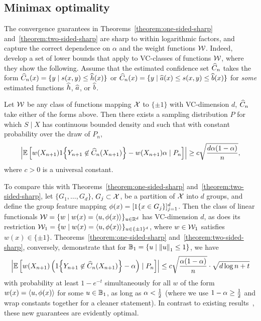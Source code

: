 \documentclass{article}
\newcommand{\scorefunc}{s}
\newcommand{\scoreval}{\scorefunc}
\newcommand{\scorerv}{S}
\begin{document}
\subsection{Minimax optimality}

The convergence guarantees in Theorems~\ref{theorem:one-sided-sharp}
and~\ref{theorem:two-sided-sharp} are sharp to within logarithmic factors,
and capture the correct dependence on $\alpha$ and the weight functions
$\mathcal{W}$.
%
Indeed, \citet{ArecesChDuKu24} develop a set of lower bounds
that apply to VC-classes of functions $\mathcal{W}$,
where they show the following.
%
Assume that the estimated confidence set $\widehat{C}_n$ takes the form
$\what{C}_n(x) = \{y \mid \scoreval(x, y) \le \what{h}(x)\}$ or
$\what{C}_n(x) = \{y \mid \what{a}(x) \le \scoreval(x, y) \le \what{b}(x)\}$
for \emph{some} estimated functions $\widehat{h}$, $\widehat{a}$, or $\widehat{b}$.
%
\begin{corollary}
  Let $\mathcal{W}$ be any class of functions mapping $\mathcal{X}$ to $\{\pm 1\}$
  with VC-dimension $d$, $\widehat{C}_n$ take either of the forms above.
  Then there exists a sampling distribution $P$ for which $\scorerv \mid X$
  has continuous bounded density and such that with constant probability
  over the draw of $P_n$,
  \begin{equation*}
    \left|\mathbb{E}\left[w(X_{n + 1}) 1\!\left\{Y_{n + 1} \not \in \widehat{C}_n(X_{n+1})\right\}
      - w(X_{n + 1}) \alpha  \mid P_n \right]\right|
    \ge c \sqrt{\frac{d \alpha(1 - \alpha)}{n}},
  \end{equation*}
  where $c > 0$ is a universal constant.
\end{corollary}
%
To compare this with Theorems~\ref{theorem:one-sided-sharp}
and~\ref{theorem:two-sided-sharp}, let $\{G_1, \ldots, G_d\}$, $G_j \subset
\mathcal{X}$, be a partition of $\mathcal{X}$ into $d$ groups, and define the group
feature mapping $\phi(x) = [1\!\left\{x \in G_j\right\}]_{j = 1}^d$.
%
Then the class of linear functionals $\mathcal{W} = \{w \mid w(x) = \langle u,
\phi(x)\rangle\}_{u \in \mathbb{R}^d}$ has VC-dimension $d$, as does its restriction
$\mathcal{W}_1 = \{w \mid w(x) = \langle u, \phi(x)\rangle\}_{u \in \{\pm 1\}^d}$, where $w
\in \mathcal{W}_1$ satisfies $w(x) \in \{\pm 1\}$.
%
Theorems~\ref{theorem:one-sided-sharp} and~\ref{theorem:two-sided-sharp},
conversely, demonstrate that for
$\mathbb{B}_1 = \{u \mid \left\|{u}\right\|_1 \le 1\}$,
we have
\begin{equation*}
  \left|\mathbb{E}\left[
      w(X_{n + 1})
      \left(1\!\left\{Y_{n + 1} \not \in \widehat{C}_n(X_{n + 1})\right\}
      - \alpha\right)
      \mid P_n\right]\right|
  \le c \sqrt{\frac{\alpha(1 - \alpha) }{n}}
  \cdot \sqrt{d \log n + t}
\end{equation*}
with probability at least $1 - e^{-t}$ simultaneously for all $w$ of the
form $w(x) = \langle u, \phi(x)\rangle$ for some $u \in \mathbb{B}_1$, as long as $\alpha <
\frac{1}{2}$ (where we use $1 - \alpha \ge \frac{1}{2}$ and wrap constants together for
a cleaner statement).
%
In contrast to existing results~\cite{JungNoRaRo23, ArecesChDuKu24}, these
new guarantees are evidently optimal.
\end{document}
